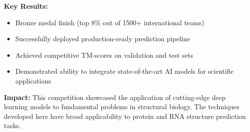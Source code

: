 \textbf{Key Results:}
\begin{itemize}[leftmargin=1.2em, itemsep=0.1em]
  \item Bronze medal finish (top 8\% out of 1500+ international teams)
  \item Successfully deployed production-ready prediction pipeline
  \item Achieved competitive TM-scores on validation and test sets
  \item Demonstrated ability to integrate state-of-the-art AI models for scientific applications
\end{itemize}

\textbf{Impact:} This competition showcased the application of cutting-edge deep learning models to fundamental problems in structural biology. The techniques developed here have broad applicability to protein and RNA structure prediction tasks.



